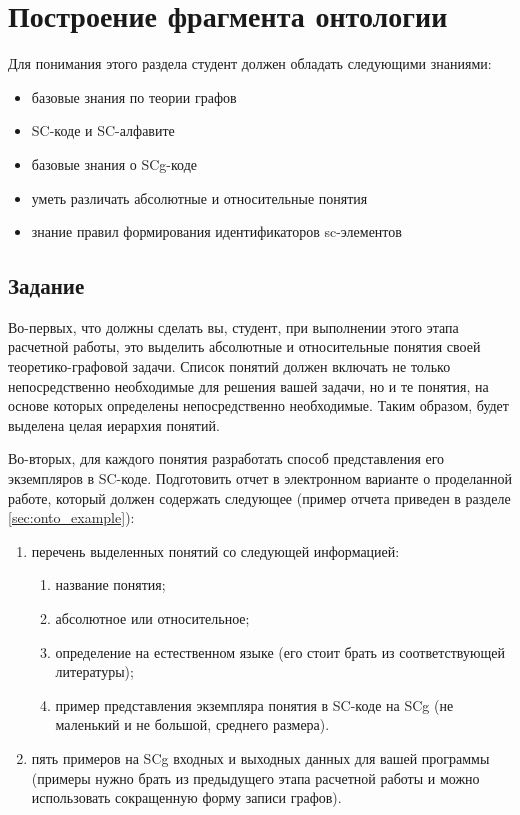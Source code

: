 
\chapter{Построение фрагмента онтологии}
\label{cha:onto}

Для понимания этого раздела студент должен обладать следующими
знаниями:

\begin{itemize}
\item базовые знания по теории графов
\item SC-коде и SC-алфавите
\item базовые знания о SCg-коде
\item уметь различать абсолютные и относительные понятия
\item знание правил формирования идентификаторов sc-элементов
\end{itemize}

\section{Задание}
\label{sec:onto_task}

Во-первых, что должны сделать вы, студент, при выполнении
этого этапа расчетной работы, это выделить абсолютные и относительные
понятия своей теоретико-графовой задачи. Список понятий должен
включать не только непосредственно необходимые для решения вашей
задачи, но и те понятия, на основе которых определены непосредственно
необходимые. Таким образом, будет выделена целая иерархия понятий.

Во-вторых, для каждого понятия разработать способ представления его
экземпляров в SC-коде. Подготовить отчет в электронном варианте о
проделанной работе, который должен содержать следующее (пример отчета
приведен в разделе \ref{sec:onto_example}):

\begin{enumerate}
\item перечень выделенных понятий со следующей информацией:
  \begin{enumerate}
  \item название понятия;
  \item абсолютное или относительное;
  \item определение на естественном языке (его стоит брать из соответствующей
    литературы);
  \item пример представления экземпляра понятия в SC-коде на
    SCg (не маленький и не большой, среднего размера). 
  \end{enumerate}
\item пять примеров на SCg входных и выходных данных для вашей
  программы (примеры нужно брать из предыдущего этапа расчетной
  работы и можно использовать сокращенную форму записи графов).
\end{enumerate}

